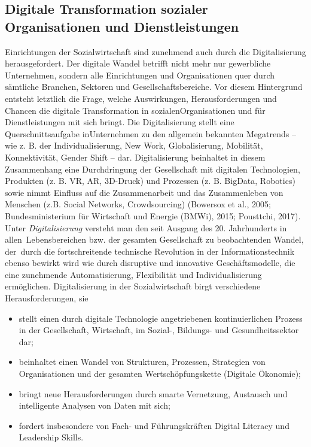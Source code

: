 \documentclass[
  letterpaper,
]{book}
\begin{document}
\subsection{Digitale Transformation sozialer Organisationen und
Dienstleistungen}\label{digitale-transformation}

Einrichtungen der Sozialwirtschaft sind zunehmend auch durch die
Digitalisierung herausgefordert. Der digitale Wandel betrifft nicht mehr
nur gewerbliche Unternehmen, sondern alle Einrichtungen und
Organisationen quer durch sämtliche Branchen, Sektoren und
Gesellschaftsbereiche. Vor diesem Hintergrund entsteht letztlich die
Frage, welche Auswirkungen, Herausforderungen und Chancen die digitale
Transformation in sozialenOrganisationen und für Dienstleistungen mit
sich bringt. Die Digitalisierung stellt eine Querschnittsaufgabe
inUnternehmen zu den allgemein bekannten Megatrends -- wie z. B. der
Individualisierung, New Work, Globalisierung, Mobilität, Konnektivität,
Gender Shift -- dar. Digitalisierung beinhaltet in diesem Zusammenhang
eine Durchdringung der Gesellschaft mit digitalen Technologien,
Produkten (z. B. VR, AR, 3D-Druck) und Prozessen (z. B. BigData,
Robotics) sowie nimmt Einfluss auf die Zusammenarbeit und das
Zusammenleben von Menschen (z.B. Social Networks, Crowdsourcing)
(Bowersox et al., 2005; Bundesministerium für Wirtschaft und Energie
(BMWi), 2015; Pousttchi, 2017). Unter \emph{Digitalisierung }versteht
man den seit Ausgang des 20. Jahrhunderts in allen~Lebensbereichen bzw.
der gesamten Gesellschaft zu beobachtenden Wandel, der~durch die
fortschreitende technische Revolution in der Informationstechnik ebenso
bewirkt wird wie durch disruptive und innovative Geschäftsmodelle, die
eine zunehmende Automatisierung, Flexibilität und Individualisierung
ermöglichen. Digitalisierung in der Sozialwirtschaft birgt verschiedene
Herausforderungen, sie

\begin{itemize}
\item
  stellt einen durch digitale Technologie angetriebenen kontinuierlichen
  Prozess in der Gesellschaft, Wirtschaft, im Sozial-, Bildungs- und
  Gesundheitssektor dar;
\item
  beinhaltet einen Wandel von Strukturen, Prozessen, Strategien von
  Organisationen und der gesamten Wertschöpfungskette (Digitale
  Ökonomie);
\item
  bringt neue Herausforderungen durch smarte Vernetzung, Austausch und
  intelligente Analysen von Daten mit sich;
\item
  fordert insbesondere von Fach- und Führungskräften Digital Literacy
  und Leadership Skills.
\end{itemize}
\end{document}
